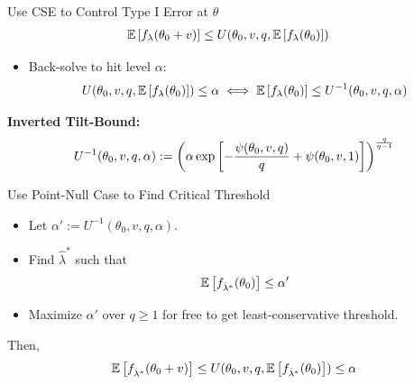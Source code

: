 \begin{frame}{Use CSE to Control Type I Error at $\theta$}
\begin{align*}
    \mathbb{E}\left[f_{\lambda}(\theta_0+v)\right]
    &\leq
    U(\theta_0, v, q, \mathbb{E}\left[f_{\lambda}(\theta_0)\right])
\end{align*} 
\begin{itemize}
    \item Back-solve to hit level $\alpha$:
        \begin{align*}
            U(\theta_0, v, q, \mathbb{E}\left[f_{\lambda}(\theta_0)\right])
            \leq 
            \alpha
            \iff
            \mathbb{E}\left[f_\lambda(\theta_0)\right]
            \leq 
            U^{-1}(\theta_0, v, q, \alpha)
        \end{align*}
\end{itemize} 
\textbf{Inverted Tilt-Bound:}
\begin{equation*}
    U^{-1}(\theta_0, v, q, \alpha) 
    := \left( 
    \alpha \exp\left[
    -\frac{\psi(\theta_0, v, q)}{q} 
    + \psi(\theta_0, v, 1)
    \right] \right)^{\frac{q}{q-1}}
\end{equation*}
\end{frame}

\begin{frame}{Use Point-Null Case to Find Critical Threshold}
\begin{itemize}
    \item Let $\alpha' := U^{-1}(\theta_0, v, q, \alpha)$.
    \item Find $\hat{\lambda}^*$ such that
        \begin{align*}
            \mathbb{E}\left[f_{\hat{\lambda}^*}(\theta_0)\right] \leq \alpha'
        \end{align*}
    \item Maximize $\alpha'$ over $q \geq 1$ 
        for free to get least-conservative threshold.
\end{itemize} 
Then,
\begin{align*}
    \mathbb{E}\left[f_{\hat{\lambda}^*}(\theta_0 + v)\right]
    \leq
    U(\theta_0, v, q, \mathbb{E}\left[f_{\hat{\lambda}^*}(\theta_0)\right])
    \leq
    \alpha
\end{align*}
\end{frame}

